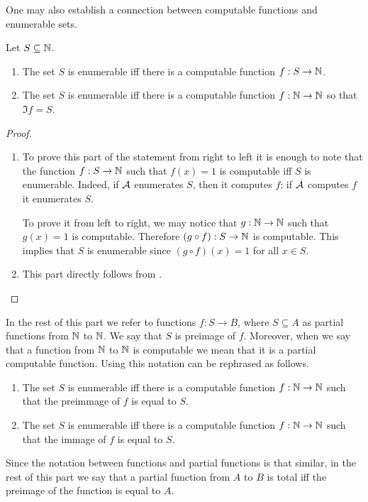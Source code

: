 One may also establish a connection between computable functions and
enumerable sets.
\begin{theorem}
\label{theorem:enumerable-via-computable-funcitons}
  Let $S \subseteq {\mathbb{N}}$.
  \begin{enumerate}
    \item The set $S$ is enumerable iff there is a computable function
      $f : S \to {\mathbb{N}}$.
    \item The set $S$ is enumerable iff there is a computable function
      $f : {\mathbb{N}} \to {\mathbb{N}}$ so that $\Im{f} = S$.
  \end{enumerate}
\end{theorem}
\begin{proof}
  \begin{enumerate}
    \item To prove this part of the statement from right to left
        it is enough to note that
        the function $f : S \to {\mathbb{N}}$ such that $f(x) = 1$ is computable iff
        $S$ is enumerable. Indeed, if $\mathcal{A}$ enumerates $S$, then
        it computes $f$; if $\mathcal{A}$ computes $f$ it enumerates $S$.

        To prove it from left to right, we may notice that $g : {\mathbb{N}} \to {\mathbb{N}}$
        such that $g(x) = 1$ is computable.
        Therefore $(g \circ f) : S \to {\mathbb{N}}$ is
        computable. This implies that $S$ is enumerable since
        $(g \circ f)(x) = 1$ for all $x \in S$.
    \item This part directly follows from
        .
  \end{enumerate}
\end{proof}

In the rest of this part we refer to functions $f : S \to B$,
where $S \subseteq A$ as partial functions from ${\mathbb{N}}$ to ${\mathbb{N}}$. We say
that $S$ is preimage of $f$. Moreover, when we say that a function
from ${\mathbb{N}}$ to ${\mathbb{N}}$ is computable we mean that it is a partial computable
function. Using this notation 
can be rephrased as follows.
\begin{corollary}
  \begin{enumerate}
    \item The set $S$ is enumerable iff there is a computable function
      $f : {\mathbb{N}} \to {\mathbb{N}}$ such that the preimmage of $f$ is equal to $S$.
    \item The set $S$ is enumerable iff there is a computable function
      $f : {\mathbb{N}} \to {\mathbb{N}}$ such that the immage of $f$ is equal to $S$.
  \end{enumerate}
\end{corollary}
Since the notation between functions and partial functions is that similar,
in the rest of this part we say that a partial function from $A$ to $B$ is
total iff the preimage of the function is equal to $A$.

